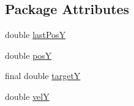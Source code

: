 \subsection*{Package Attributes}
\begin{DoxyCompactItemize}
\item 
double \hyperlink{classbattleship2D_1_1ui_1_1Particle_a5a420fd563faed7e5fe9635413dd6b5e}{last\-Pos\-Y}
\item 
double \hyperlink{classbattleship2D_1_1ui_1_1Particle_ad049d4283943c3eb9f3ed76dfdb585c2}{pos\-Y}
\item 
final double \hyperlink{classbattleship2D_1_1ui_1_1Particle_a0c427daa62b3aa8f58077879af4e4c24}{target\-Y}
\item 
double \hyperlink{classbattleship2D_1_1ui_1_1Particle_a75fa162ccfdadf4b05828097a4e1549c}{vel\-Y}
\end{DoxyCompactItemize}
